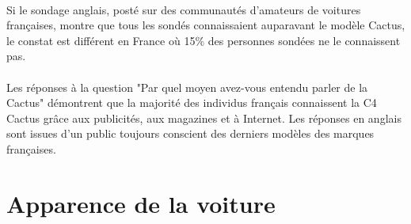 \documentclass[12pt]{article}\usepackage[]{graphicx}\usepackage[]{color}
\newenvironment{knitrout}{}{} %
\begin{document}
\paragraph{} Si le sondage anglais, posté sur des communautés d'amateurs de voitures
françaises, montre que tous les sondés connaissaient auparavant le modèle Cactus,
le constat est différent en France où 15\% des personnes sondées ne le connaissent pas.


%
%
%
%
%

\paragraph{} Les réponses à la question "Par quel moyen avez-vous entendu parler de la Cactus"
démontrent que la majorité des individus français connaissent la C4 Cactus grâce aux publicités,
aux magazines et à Internet. Les réponses en anglais sont issues d'un public toujours conscient des
derniers modèles des marques françaises.

\break
\section{Apparence de la voiture}
\end{document}
